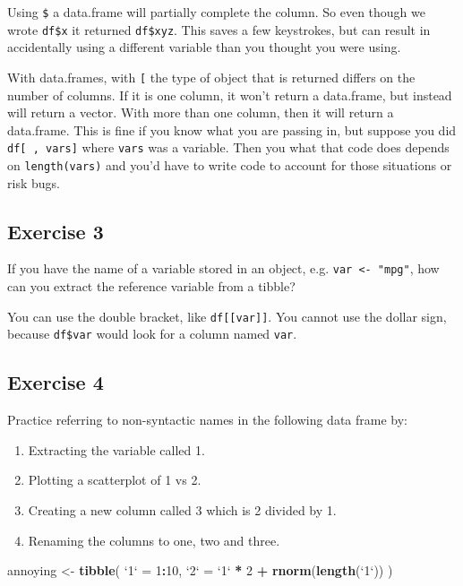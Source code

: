 \documentclass[]{book}
\newenvironment{Shaded}{\begin{snugshade}}{\end{snugshade}}
\newcommand{\DataTypeTok}[1]{\textcolor[rgb]{0.13,0.29,0.53}{#1}}
\newcommand{\DecValTok}[1]{\textcolor[rgb]{0.00,0.00,0.81}{#1}}
\newcommand{\KeywordTok}[1]{\textcolor[rgb]{0.13,0.29,0.53}{\textbf{#1}}}
\newcommand{\NormalTok}[1]{#1}
\newcommand{\OperatorTok}[1]{\textcolor[rgb]{0.81,0.36,0.00}{\textbf{#1}}}
\newcommand{\StringTok}[1]{\textcolor[rgb]{0.31,0.60,0.02}{#1}}
\providecommand{\tightlist}{%
  \setlength{\itemsep}{0pt}\setlength{\parskip}{0pt}}
\theoremstyle{definition}
\theoremstyle{definition}
\theoremstyle{definition}
\theoremstyle{remark}
\begin{document}
Using \texttt{\$} a data.frame will partially complete the column. So
even though we wrote \texttt{df\$x} it returned \texttt{df\$xyz}. This
saves a few keystrokes, but can result in accidentally using a different
variable than you thought you were using.

With data.frames, with \texttt{{[}} the type of object that is returned
differs on the number of columns. If it is one column, it won't return a
data.frame, but instead will return a vector. With more than one column,
then it will return a data.frame. This is fine if you know what you are
passing in, but suppose you did \texttt{df{[}\ ,\ vars{]}} where
\texttt{vars} was a variable. Then you what that code does depends on
\texttt{length(vars)} and you'd have to write code to account for those
situations or risk bugs.

\hypertarget{exercise-3-10}{%
\subsection{Exercise 3}\label{exercise-3-10}}

If you have the name of a variable stored in an object, e.g.
\texttt{var\ \textless{}-\ "mpg"}, how can you extract the reference
variable from a tibble?

You can use the double bracket, like \texttt{df{[}{[}var{]}{]}}. You
cannot use the dollar sign, because \texttt{df\$var} would look for a
column named \texttt{var}.

\hypertarget{exercise-4-9}{%
\subsection{Exercise 4}\label{exercise-4-9}}

Practice referring to non-syntactic names in the following data frame
by:

\begin{enumerate}
\def\labelenumi{\arabic{enumi}.}
\tightlist
\item
  Extracting the variable called 1.
\item
  Plotting a scatterplot of 1 vs 2.
\item
  Creating a new column called 3 which is 2 divided by 1.
\item
  Renaming the columns to one, two and three.
\end{enumerate}

\begin{Shaded}
\begin{Highlighting}[]
\NormalTok{annoying <-}\StringTok{ }\KeywordTok{tibble}\NormalTok{(}
  \StringTok{`}\DataTypeTok{1}\StringTok{`}\NormalTok{ =}\StringTok{ }\DecValTok{1}\OperatorTok{:}\DecValTok{10}\NormalTok{,}
  \StringTok{`}\DataTypeTok{2}\StringTok{`}\NormalTok{ =}\StringTok{ `}\DataTypeTok{1}\StringTok{`} \OperatorTok{*}\StringTok{ }\DecValTok{2} \OperatorTok{+}\StringTok{ }\KeywordTok{rnorm}\NormalTok{(}\KeywordTok{length}\NormalTok{(}\StringTok{`}\DataTypeTok{1}\StringTok{`}\NormalTok{))}
\NormalTok{)}
\end{Highlighting}
\end{Shaded}
\end{document}
